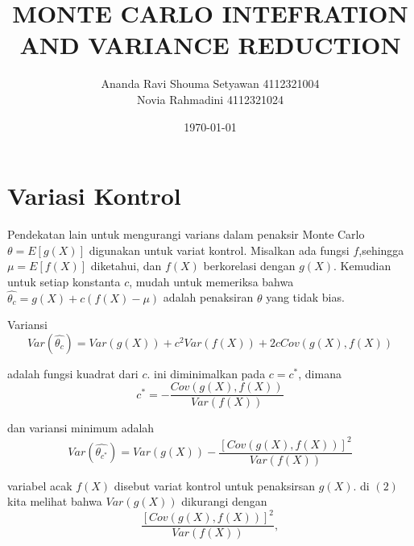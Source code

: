 \documentclass[a4paper,12pt]{article}
\theoremstyle{definition}
\begin{document}
    \title{MONTE CARLO INTEFRATION AND VARIANCE REDUCTION}
    \author{Ananda Ravi Shouma Setyawan 4112321004\\
    Novia Rahmadini 4112321024}
\date{\today}
\begin{titlepage}
    \maketitle
\end{titlepage}


\section{Variasi Kontrol}
Pendekatan lain untuk mengurangi varians dalam penaksir Monte Carlo $\theta = E\left [ g\left ( X \right ) \right ]$ digunakan untuk variat kontrol. Misalkan ada fungsi $f$,sehingga $\mu = E\left [ f\left ( X \right ) \right ]$ diketahui, dan $f\left ( X \right )$ berkorelasi dengan $g\left ( X \right )$. Kemudian untuk setiap konstanta $c$, mudah untuk memeriksa bahwa $\widehat{\theta_{c}}=g\left ( X \right )+c\left ( f\left ( X \right )-\mu  \right )$ adalah penaksiran $\theta$ yang tidak bias. 

Variansi
\begin{equation*}
    Var\left ( \widehat{\theta_{c} } \right )=Var\left ( g\left ( X \right ) \right )+c^{2}Var\left ( f\left ( X \right ) \right )+2cCov\left ( g\left ( X \right ) ,f\left ( X \right )\right )
\end{equation*}

adalah fungsi kuadrat dari $c$. ini diminimalkan pada $c=c^{*}$, dimana
\begin{equation}
    c^{*}=-\frac{Cov\left ( g\left ( X \right ),f\left ( X \right ) \right )}{Var\left ( f\left ( X \right ) \right )}
\end{equation}

dan variansi minimum adalah 
\begin{equation}
    Var\left ( \widehat{\theta _{c^{*}}} \right )=Var\left ( g\left ( X \right ) \right )-\frac{\left [ Cov\left ( g\left ( X \right ),f\left ( X \right ) \right ) \right ]^{2}}{Var\left ( f\left ( X \right ) \right )}
\end{equation}

variabel acak $f\left ( X \right )$ disebut variat kontrol untuk penaksirsan $g\left ( X \right )$. di $\left ( 2 \right )$ kita melihat bahwa $Var\left ( g\left (X \right ) \right )$ dikurangi dengan
\begin{equation*}
    \frac{\left [ Cov\left ( g\left ( X \right ),f\left ( X \right ) \right ) \right ]^{2}}{Var\left ( f\left ( X \right ) \right )},
\end{equation*}
\end{document}
